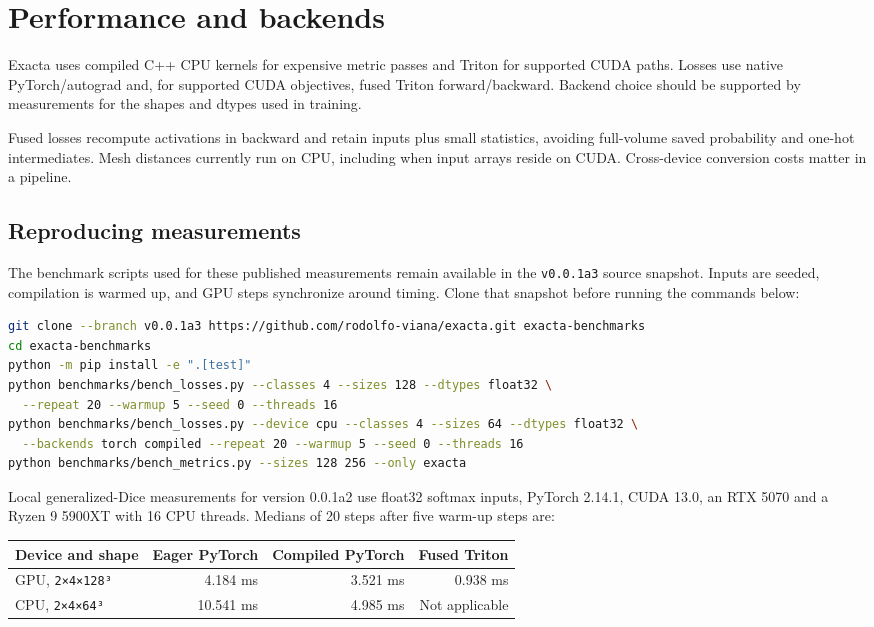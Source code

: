 \chapter{Performance and backends}\label{ch:performance}

Exacta uses compiled C++ CPU kernels for expensive metric passes and Triton for supported
CUDA paths. Losses use native PyTorch/autograd and, for supported CUDA objectives,
fused Triton forward/backward.
Backend choice should be supported by measurements for the shapes and dtypes used in training.

Fused losses recompute activations in backward and retain inputs plus small statistics, avoiding
full-volume saved probability and one-hot intermediates. Mesh distances currently run on CPU,
including when input arrays reside on CUDA. Cross-device conversion costs matter in a pipeline.

\section{Reproducing measurements}\label{performance:reproducing-measurements}

The benchmark scripts used for these published measurements remain available in the
\texttt{v0.0.1a3} source snapshot. Inputs are seeded, compilation is warmed up, and GPU steps
synchronize around timing. Clone that snapshot before running the commands below:

\begin{lstlisting}[language=bash]
git clone --branch v0.0.1a3 https://github.com/rodolfo-viana/exacta.git exacta-benchmarks
cd exacta-benchmarks
python -m pip install -e ".[test]"
python benchmarks/bench_losses.py --classes 4 --sizes 128 --dtypes float32 \
  --repeat 20 --warmup 5 --seed 0 --threads 16
python benchmarks/bench_losses.py --device cpu --classes 4 --sizes 64 --dtypes float32 \
  --backends torch compiled --repeat 20 --warmup 5 --seed 0 --threads 16
python benchmarks/bench_metrics.py --sizes 128 256 --only exacta
\end{lstlisting}

Local generalized-Dice measurements for version 0.0.1a2 use float32 softmax inputs, PyTorch 2.14.1,
CUDA 13.0, an RTX 5070 and a Ryzen 9 5900XT with 16 CPU threads. Medians of 20 steps after five
warm-up steps are:

{\small{} %
\begin{longtable}[]{@{}lrrr@{}}
\toprule\noalign{}
Device and shape & Eager PyTorch & Compiled PyTorch & Fused Triton \\
\midrule\noalign{}
\endhead
\bottomrule\noalign{}
\endlastfoot
GPU, \texttt{2×4×128³} & 4.184 ms & 3.521 ms & 0.938 ms \\
CPU, \texttt{2×4×64³} & 10.541 ms & 4.985 ms & Not applicable \\
\end{longtable}
}

